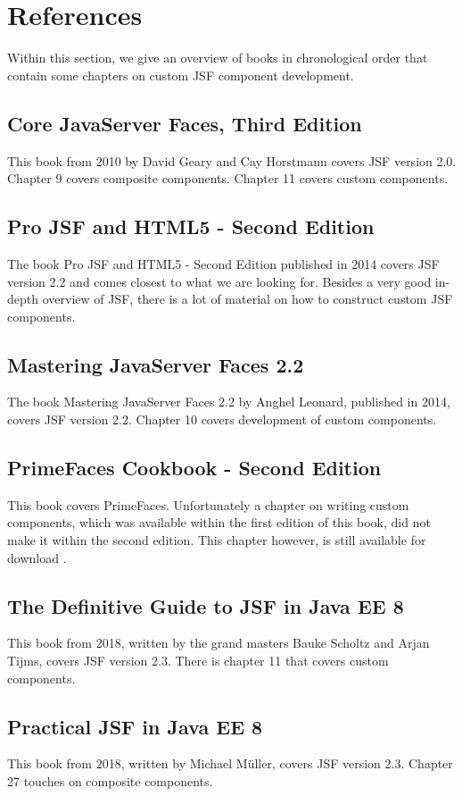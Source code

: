 %

\chapter*{References}
\label{chap:references}
Within this section, we give an overview of books in chronological order that contain some chapters on custom JSF component development.


\section*{Core JavaServer Faces, Third Edition}
This book \cite{geary2010core} from 2010 by David Geary and Cay Horstmann covers JSF version 2.0.
Chapter 9 covers composite components.
Chapter 11 covers custom components.


\section*{Pro JSF and HTML5 - Second Edition}
The book Pro JSF and HTML5 - Second Edition \cite{wadia2014pro} published in 2014 covers JSF version 2.2 and comes closest to what we are looking for.
Besides a very good in-depth overview of JSF, there is a lot of material on how to construct custom JSF components.


\section*{Mastering JavaServer Faces 2.2}
The book Mastering JavaServer Faces 2.2 \cite{leonard2014mastering} by Anghel Leonard, published in 2014, covers JSF version 2.2.
Chapter 10 covers development of custom components.
 
 
 \section*{PrimeFaces Cookbook - Second Edition}
 This book \cite{10.5555/2834507} covers PrimeFaces.
 Unfortunately a chapter on writing custom components, which was available within the first edition of this book, did not make it within the second edition.
 This chapter however, is still available for download \cite{PrimeFacesCookbookChapter11}.


\section*{The Definitive Guide to JSF in Java EE 8}
This book \cite{Scholtz2018TheDG} from 2018, written by the grand masters Bauke Scholtz and Arjan Tijms, covers JSF version 2.3.
There is chapter 11 that covers custom components.


\section*{Practical JSF in Java EE 8}
This book \cite{muller2018practicalJSF} from 2018, written by Michael Müller, covers JSF version 2.3.
Chapter 27 touches on composite components.



